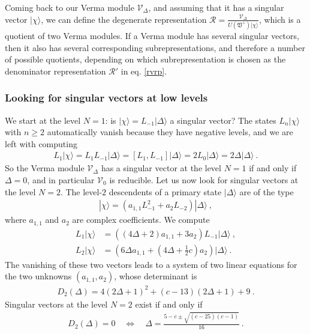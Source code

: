 \documentclass[12pt, a4paper, notitlepage, twoside]{report}
\numberwithin{equation}{section}
\theoremstyle{break}
\begin{document}
Coming back to our Verma module $\mathcal{V}_\Delta$, and assuming that it has a singular vector $|\chi\rangle$, we can define the degenerate representation $\mathcal{R} = \frac{\mathcal{V}_\Delta}{U(\mathfrak{V}^+)|\chi\rangle}$, which is a quotient of two Verma modules.
If a Verma module has several singular vectors, then it also has several corresponding subrepresentations, and therefore a number of possible quotients, depending on which subrepresentation is chosen as the denominator representation $\mathcal{R}'$ in eq. \eqref{rvrp}.

\subsubsection{Looking for singular vectors at low levels}

We start at the level $N=1$: is $|\chi\rangle=L_{-1}|\Delta\rangle$ a singular vector? The states $L_n|\chi\rangle$ with $n\geq 2$ automatically vanish because they have negative levels, and we are left with computing
\begin{align}
 L_1|\chi\rangle = L_1 L_{-1}|\Delta\rangle = [L_1,L_{-1}]|\Delta\rangle = 2L_0 |\Delta\rangle = 2\Delta|\Delta\rangle\ .
\end{align}
So the Verma module $\mathcal{V}_\Delta$ has a singular vector at the level $N=1$ if and only if $\Delta = 0$, and in particular $\mathcal{V}_0$ is reducible.
Let us now look for singular vectors at the level $N=2$.
The level-$2$ descendents of a primary state $|\Delta\rangle$ are of the type
\begin{align}
 |\chi\rangle = \left(a_{1,1} L_{-1}^2 + a_2 L_{-2}\right) |\Delta\rangle\ ,
\end{align}
where $a_{1,1}$ and $a_2$ are complex coefficients.
We compute 
\begin{align}
 L_1|\chi\rangle &= \left((4\Delta+2)a_{1,1} + 3a_2\right) L_{-1}|\Delta\rangle\ ,
\\
L_2 |\chi \rangle &= \left(6\Delta a_{1,1}+(4\Delta+\tfrac12 c) a_2\right)|\Delta\rangle\ .
\end{align}
The vanishing of these two vectors leads to a system of two linear equations for the two unknowns $(a_{1,1},a_2)$, whose determinant is 
\begin{align}
 D_2(\Delta) = 4(2\Delta+1)^2 +(c-13)(2\Delta+1) +9\ . 
\label{dud}
\end{align}
Singular vectors at the level $N=2$ exist if and only if
\begin{align}
D_2(\Delta)=0 \quad \iff \quad \Delta = \frac{5-c\pm \sqrt{(c-25)(c-1)}}{16}\ .
\label{dcscc}
\end{align}
\end{document}
